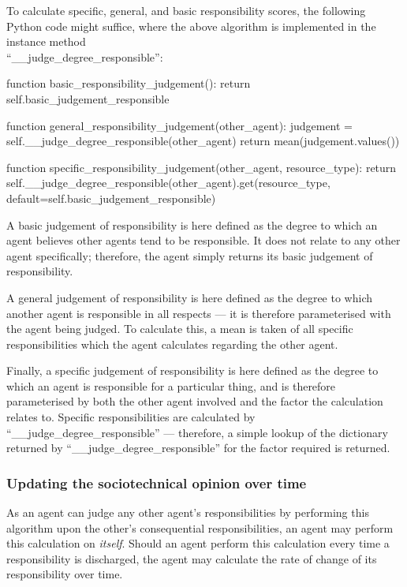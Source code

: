 To calculate specific, general, and basic responsibility scores, the following Python code might suffice, where the above algorithm is implemented in the instance method\\``\_\_judge\_degree\_responsible'':

\begin{pseudocodelisting}
function basic_responsibility_judgement():
    return self.basic_judgement_responsible

function general_responsibility_judgement(other_agent):
    judgement = self.__judge_degree_responsible(other_agent)
    return mean(judgement.values())

function specific_responsibility_judgement(other_agent, resource_type):
    return self.__judge_degree_responsible(other_agent).get(resource_type, default=self.basic_judgement_responsible)
\end{pseudocodelisting}

A basic judgement of responsibility is here defined as the degree to which an agent believes other agents tend to be responsible. It does not relate to any other agent specifically; therefore, the agent simply returns its basic judgement of responsibility.\par

A general judgement of responsibility is here defined as the degree to which another agent is responsible in all respects --- it is therefore parameterised with the agent being judged. To calculate this, a mean is taken of all specific responsibilities which the agent calculates regarding the other agent.\par

Finally, a specific judgement of responsibility is here defined as the degree to which an agent is responsible for a particular thing, and is therefore parameterised by both the other agent involved and the factor the calculation relates to. Specific responsibilities are calculated by\\``\_\_judge\_degree\_responsible'' --- therefore, a simple lookup of the dictionary returned by ``\_\_judge\_degree\_responsible'' for the factor required is returned.

\subsubsection{Updating the sociotechnical opinion over time}
As an agent can judge any other agent's responsibilities by performing this algorithm upon the other's consequential responsibilities, an agent may perform this calculation on \emph{itself}. Should an agent perform this calculation every time a responsibility is discharged, the agent may calculate the rate of change of its responsibility over time.\par

